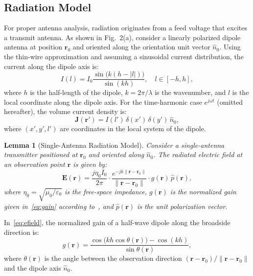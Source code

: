 \documentclass[journal]{IEEEtran}
\newtheorem{lemma}{Lemma}
\begin{document}
\subsection{Radiation Model}

For proper antenna analysis, radiation originates from a feed voltage that excites a transmit antenna. As shown in Fig.~2(a), consider a linearly polarized dipole antenna at position $\mathbf{r}_0$ and oriented along the orientation unit vector $\hat{n}_0$. Using the thin-wire approximation and assuming a sinusoidal current distribution, the current along the dipole axis is:
\begin{equation}
    I(l) = I_0 \frac{\sin\bigl(k(h - |l|)\bigr)}{\sin(kh)}, \quad l \in [-h, h],
\end{equation}
where $h$ is the half-length of the dipole, $k = 2\pi/\lambda$ is the wavenumber, and $l$ is the local coordinate along the dipole axis. For the time-harmonic case $e^{j\omega t}$ (omitted hereafter), the volume current density is:
\begin{equation}
    \mathbf{J}(\mathbf{r}') = I(l')\,\delta(x')\,\delta(y')\,\hat{n}_0,
\end{equation}
where $(x', y', l')$ are coordinates in the local system of the dipole.

\begin{lemma}[Single-Antenna Radiation Model]
Consider a single-antenna transmitter positioned at $\mathbf{r}_0$ and oriented along $\hat{n}_0$. The radiated electric field at an observation point $\mathbf{r}$ is given by:
\begin{equation}
    \mathbf{E}(\mathbf{r}) = \frac{j\eta_0 I_0}{2\pi} \cdot \frac{e^{-jk\|\mathbf{r} - \mathbf{r}_0\|}}{\|\mathbf{r} - \mathbf{r}_0\|} \cdot g(\mathbf{r})\, \hat{p}(\mathbf{r}),
    \label{eq:efield}
\end{equation}
where $\eta_0 = \sqrt{\mu_0/\varepsilon_0}$ is the free-space impedance, $g(\mathbf{r})$ is the normalized gain given in~\eqref{eq:gain} according to~\cite{ref8}, and $\hat{p}(\mathbf{r})$ is the unit polarization vector.
\end{lemma}

In~\eqref{eq:efield}, the normalized gain of a half-wave dipole along the broadside direction is:
\begin{equation}
    g(\mathbf{r}) = \frac{\cos\!\bigl(kh\cos\theta(\mathbf{r})\bigr) - \cos(kh)}{\sin\theta(\mathbf{r})},
    \label{eq:gain}
\end{equation}
where $\theta(\mathbf{r})$ is the angle between the observation direction $(\mathbf{r} - \mathbf{r}_0)/\|\mathbf{r} - \mathbf{r}_0\|$ and the dipole axis $\hat{n}_0$.
\end{document}
